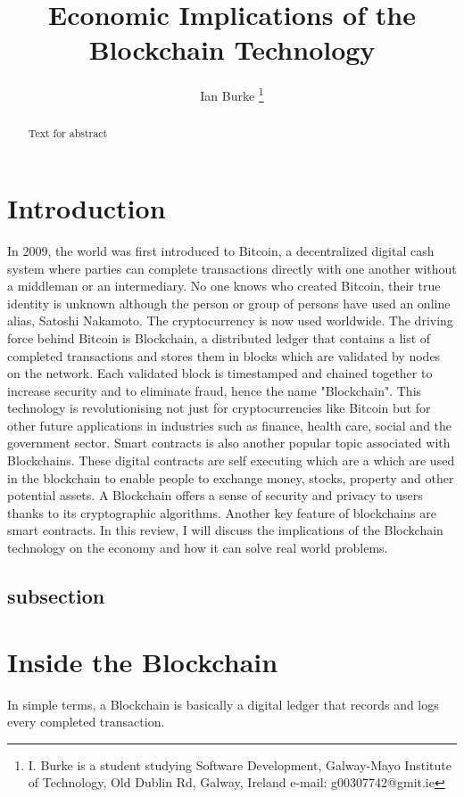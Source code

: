 \documentclass[report]{IEEEtran}
\begin{document}
\title{Economic Implications of the Blockchain Technology}
\author{Ian Burke %
\thanks{I. Burke is a student studying
Software Development, Galway-Mayo Institute of Technology, Old Dublin Rd, Galway, Ireland e-mail: g00307742@gmit.ie}%
}

\maketitle

\begin{abstract}
Text for abstract
\end{abstract}


\section{Introduction}
In 2009, the world was first introduced to Bitcoin, a decentralized digital cash system where parties can complete transactions directly with one another without a middleman or an intermediary. No one knows who created Bitcoin, their true identity is unknown although the person or group of persons have used an online alias, Satoshi Nakamoto. The cryptocurrency is now used worldwide. The driving force behind Bitcoin is Blockchain, a distributed ledger that contains a list of completed transactions and stores them in blocks which are validated by nodes on the network. Each validated block is timestamped and chained together to increase security and to eliminate fraud, hence the name "Blockchain". This technology is revolutionising not just for cryptocurrencies like Bitcoin but for other future applications in industries such as finance, health care, social and the government sector. Smart contracts is also another popular topic associated with Blockchains. These digital contracts are self executing which are a which are used in the blockchain to enable people to exchange money, stocks, property and other potential assets. A Blockchain offers a sense of security and privacy to users thanks to its cryptographic algorithms. Another key feature of blockchains are smart contracts.  In this review, I will discuss the implications of the Blockchain technology on the economy and how it can solve real world problems.
\subsection{subsection}

\section{Inside the Blockchain}
In simple terms, a Blockchain is basically a digital ledger that records and logs every completed transaction. 
\end{document}
